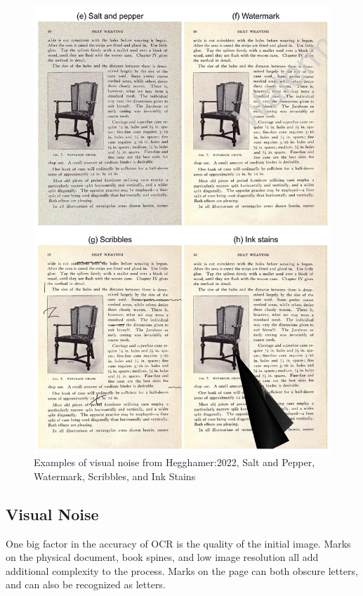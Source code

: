 \documentclass[sigplan,screen,nonacm]{acmart-tagged}
\begin{document}
\begin{figure}
  \includegraphics[width=\linewidth]{noise.png}
  \caption{Examples of visual noise from Hegghamer:2022, Salt and Pepper, Watermark, Scribbles, and Ink Stains}
  \label{fig:noise}
\end{figure}

\subsection{Visual Noise}
\label{Noise}

One big factor in the accuracy of OCR is the quality of the initial image. Marks on the physical document, book spines, and low image resolution all add additional complexity to the process. Marks on the page can both obscure letters, and can also be recognized as letters.
\end{document}
